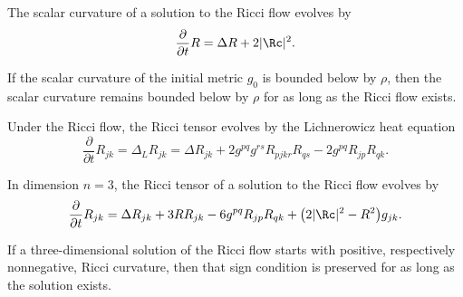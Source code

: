 \begin{lemma}
\label{ch06-lem-scalar-curvature-under-ricci-flow}
The scalar curvature of a solution to the Ricci flow evolves by
\[
\frac{\partial}{\partial t}R=\Delta R+2|\Rc|^2.
\]
\end{lemma}

\begin{lemma}
\label{ch06-lem-preservation-scalar-lower-bounds}
If the scalar curvature of the initial metric \(g_0\) is bounded below by \(\rho\), then the scalar curvature remains bounded below by \(\rho\) for as long as the Ricci flow exists.
\end{lemma}

\begin{lemma}
\label{ch06-lem-ricci-evolution-general-dimension}
Under the Ricci flow, the Ricci tensor evolves by the Lichnerowicz heat equation
\[
\frac{\partial}{\partial t}R_{jk}=\Delta_L R_{jk}=\Delta R_{jk}+2g^{pq}g^{rs}R_{pjkr}R_{qs}-2g^{pq}R_{jp}R_{qk}.
\]
\end{lemma}

\begin{lemma}
\label{ch06-lem-ricci-evolution-dimension-three}
In dimension \(n=3\), the Ricci tensor of a solution to the Ricci flow evolves by
\[
\frac{\partial}{\partial t}R_{jk}=\Delta R_{jk}+3RR_{jk}-6g^{pq}R_{jp}R_{qk}+\bigl(2|\Rc|^2-R^2\bigr)g_{jk}.
\]
\end{lemma}

\begin{corollary}
\label{ch06-cor-preservation-ricci-sign-three}
If a three-dimensional solution of the Ricci flow starts with positive, respectively nonnegative, Ricci curvature, then that sign condition is preserved for as long as the solution exists.
\end{corollary}

